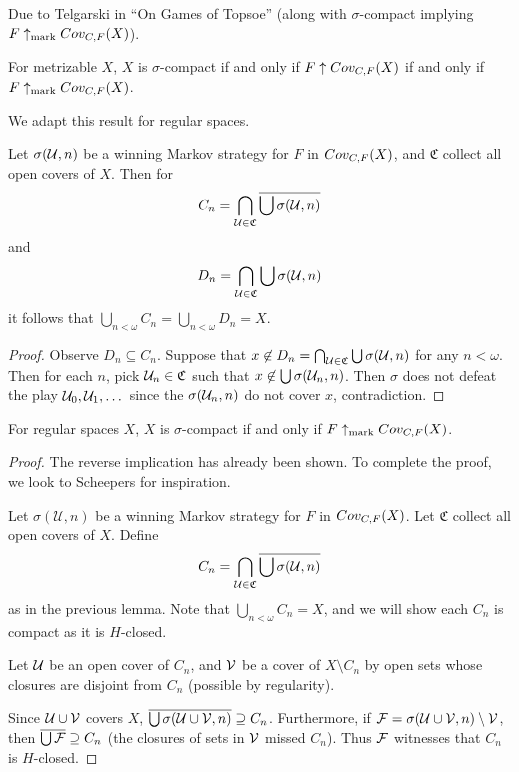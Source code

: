   Due to Telgarski in ``On Games of Topsoe'' (along with $\sigma$-compact implying $F\uparrow_{\text{mark}} Cov_{C,F}(X)$).

  \begin{theorem}
    For metrizable $X$, $X$ is $\sigma$-compact if and only if $F \uparrow Cov_{C,F}(X)$ if and only if $F\uparrow_{\text{mark}} Cov_{C,F}(X)$.
  \end{theorem}

  We adapt this result for regular spaces.

  \begin{lemma}
    Let $\sigma(\mathcal{U}, n)$ be a winning Markov strategy for $F$ in $Cov_{C,F}(X)$, and $\mathfrak{C}$ collect all open covers of $X$. Then for
      \[
        C_n = \bigcap_{\mathcal{U}\in\mathfrak{C}} \overline{\bigcup\sigma(\mathcal{U},n)}
      \]
    and
      \[
        D_n = \bigcap_{\mathcal{U}\in\mathfrak{C}} \bigcup\sigma(\mathcal{U},n)
      \]
    it follows that $\bigcup_{n<\omega} C_n = \bigcup_{n<\omega} D_n = X$.
  \end{lemma}

  \begin{proof}
    Observe $D_n \subseteq C_n$. Suppose that $x \not\in D_n = \bigcap_{\mathcal{U}\in\mathfrak{C}} \bigcup\sigma(\mathcal{U},n)$ for any $n<\omega$. Then for each $n$, pick $\mathcal{U}_n\in\mathfrak{C}$ such that $x\not\in \bigcup\sigma(\mathcal{U}_n,n)$. Then $\sigma$ does not defeat the play $\mathcal{U}_0,\mathcal{U}_1,\dots$ since the $\sigma(\mathcal{U}_n,n)$ do not cover $x$, contradiction.
  \end{proof}

  \begin{theorem}
    For regular spaces $X$, $X$ is $\sigma$-compact if and only if $F \uparrow_{\text{mark}} Cov_{C,F}(X)$.
  \end{theorem}

  \begin{proof}
    The reverse implication has already been shown. To complete the proof, we look to Scheepers for inspiration.

    Let $\sigma(\mathcal{U},n)$ be a winning Markov strategy for $F$ in $Cov_{C,F}(X)$. Let $\mathfrak{C}$ collect all open covers of $X$. Define
      \[
        C_n = \bigcap_{\mathcal{U}\in\mathfrak{C}} \overline{\bigcup\sigma(\mathcal{U},n)}
      \]
    as in the previous lemma. Note that $\bigcup_{n<\omega} C_n = X$, and we will show each $C_n$ is compact as it is $H$-closed.

    Let $\mathcal{U}$ be an open cover of $C_n$, and $\mathcal{V}$ be a cover of $X\setminus C_n$ by open sets whose closures are disjoint from $C_n$ (possible by regularity).

    Since $\mathcal{U}\cup\mathcal{V}$ covers $X$, $\overline{\bigcup\sigma(\mathcal{U}\cup\mathcal{V},n)} \supseteq C_n$. Furthermore, if $\mathcal{F} = \sigma(\mathcal{U}\cup\mathcal{V},n)\setminus \mathcal{V}$, then $\overline{\bigcup\mathcal{F}} \supseteq C_n$ (the closures of sets in $\mathcal{V}$ missed $C_n$). Thus $\mathcal{F}$ witnesses that $C_n$ is $H$-closed.
  \end{proof}

